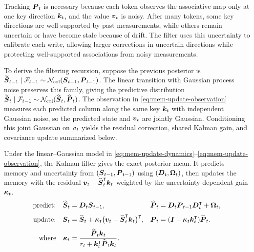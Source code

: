 \documentclass{article} %
\begin{document}
Tracking $\boldsymbol{P}_t$ is necessary because each token observes the associative map only at one key
direction $\boldsymbol{k}_t$, and the value $\boldsymbol{v}_t$ is noisy. After many tokens, some key directions are
well supported by past measurements, while others remain uncertain or have become stale
because of drift. The filter uses this uncertainty to calibrate each write, allowing larger
corrections in uncertain directions while protecting well-supported associations from noisy
measurements.

To derive the filtering recursion, suppose the previous posterior is
$\widetilde{\boldsymbol{S}}_{t-1}\mid\mathcal{F}_{t-1}
\sim\mathcal N_{\mathrm{col}}(\boldsymbol{S}_{t-1},\boldsymbol{P}_{t-1})$. The linear transition with Gaussian process
noise preserves this family, giving the predictive distribution
$\widetilde{\boldsymbol{S}}_t\mid\mathcal{F}_{t-1}
\sim\mathcal N_{\mathrm{col}}(\widehat{\boldsymbol{S}}_t,\widehat{\boldsymbol{P}}_t)$. The observation in
\eqref{eq:mem-update-observation} measures each predicted column along the same key $\boldsymbol{k}_t$ with
independent Gaussian noise, so the predicted state and $\boldsymbol{v}_t$ are jointly Gaussian.
Conditioning this joint Gaussian on $\boldsymbol{v}_t$ yields the residual correction, shared Kalman gain,
and covariance update summarized below.

\label{prop:kalman-associative-memory}
\begin{tcolorbox}[
  title={Proposition~\thedefinition: Kalman Associative Memory},
  colback=blue!7,
  colbacktitle=blue!22,
  colframe=blue!45!black,
  coltitle=black,
  fonttitle=\bfseries,
  boxrule=0.4pt,
  arc=1pt,
  left=5pt,
  right=5pt,
  top=5pt,
  bottom=5pt
]
Under the linear--Gaussian model in
\eqref{eq:mem-update-dynamics}--\eqref{eq:mem-update-observation}, the Kalman filter gives the
exact posterior mean. It predicts memory and uncertainty from
$(\boldsymbol{S}_{t-1},\boldsymbol{P}_{t-1})$ using $(\boldsymbol{D}_t,\boldsymbol{\Omega}_t)$, then updates the memory with the
residual $\boldsymbol{v}_t-\widehat{\boldsymbol{S}}_t^{\intercal}\boldsymbol{k}_t$ weighted by the uncertainty-dependent gain
$\boldsymbol{\kappa}_t$.
\begin{equation}
\begin{aligned}
  \text{predict:}\quad
  \widehat{\boldsymbol{S}}_t &= \boldsymbol{D}_t \boldsymbol{S}_{t-1},
  &
  \widehat{\boldsymbol{P}}_t &= \boldsymbol{D}_t \boldsymbol{P}_{t-1}\boldsymbol{D}_t^{\intercal}+\boldsymbol{\Omega}_t,
  \\[3pt]
  \text{update:}\quad
  \boldsymbol{S}_t &= \widehat{\boldsymbol{S}}_t+\boldsymbol{\kappa}_t
  \big(\boldsymbol{v}_t-\widehat{\boldsymbol{S}}_t^{\intercal}\boldsymbol{k}_t\big)^{\intercal},
  &
  \boldsymbol{P}_t &= (\boldsymbol{I}-\boldsymbol{\kappa}_t \boldsymbol{k}_t^{\intercal})\widehat{\boldsymbol{P}}_t .
  \\[3pt]
  \text{where}\quad
  \boldsymbol{\kappa}_t &= \frac{\widehat{\boldsymbol{P}}_t \boldsymbol{k}_t}
  {r_t+\boldsymbol{k}_t^{\intercal}\widehat{\boldsymbol{P}}_t \boldsymbol{k}_t}.
\end{aligned}
\label{eq:kalman-optimal-update-box}
\end{equation}
\end{tcolorbox}
\end{document}
